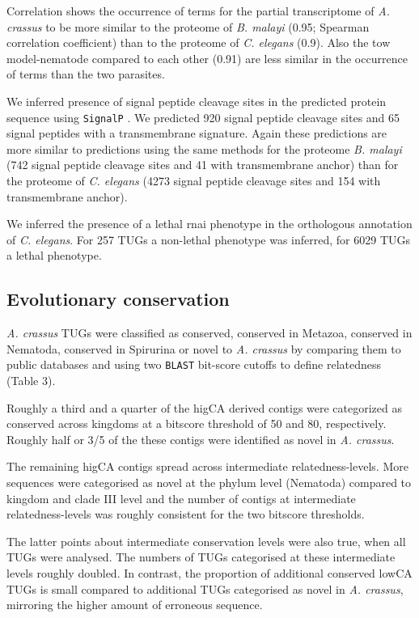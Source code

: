 \documentclass[10pt]{bmc_article}
\newenvironment{bmcformat}{\begin{raggedright}\baselineskip20pt\sloppy\setboolean{publ}{false}}{\end{raggedright}\baselineskip20pt\sloppy}
\begin{document}
\begin{bmcformat}
Correlation shows the occurrence of terms for the partial
transcriptome of \textit{A. crassus} to be more similar to the
proteome of \textit{B. malayi} (0.95;
Spearman correlation coefficient) than to the proteome of
\textit{C. elegans} (0.9). Also the tow
model-nematode compared to each other (0.91)
are less similar in the occurrence of terms than the two parasites.

We inferred presence of signal peptide cleavage sites in the predicted
protein sequence using \texttt{SignalP} \cite{pmid21959131}. We predicted
920 signal peptide cleavage sites and 65 signal
peptides with a transmembrane signature. Again these predictions are
more similar to predictions using the same methods for the proteome
\textit{B. malayi} (742 signal peptide cleavage sites and
41 with transmembrane anchor) than for the proteome of
\textit{C. elegans} (4273 signal peptide cleavage sites
and 154 with transmembrane anchor).

We inferred the presence of a lethal rnai phenotype in the orthologous
annotation of \textit{C. elegans}. For 257
TUGs a non-lethal phenotype was inferred, for
6029 TUGs a lethal phenotype.

\subsection*{Evolutionary conservation}

\textit{A. crassus} TUGs were classified as conserved, conserved in
Metazoa, conserved in Nematoda, conserved in Spirurina or novel to
\textit{A. crassus} by comparing them to public databases and using
two \texttt{BLAST} bit-score cutoffs to define relatedness (Table 3).

Roughly a third and a quarter of the higCA derived contigs were
categorized as conserved across kingdoms at a bitscore threshold of 50
and 80, respectively. Roughly half or 3/5 of the these contigs were
identified as novel in \textit{A. crassus}.

The remaining higCA contigs spread across intermediate
relatedness-levels. More sequences were categorised as novel at the
phylum level (Nematoda) compared to kingdom and clade III level and the
number of contigs at intermediate relatedness-levels was roughly
consistent for the two bitscore thresholds.

The latter points about intermediate conservation levels were also
true, when all TUGs were analysed. The numbers of TUGs categorised at
these intermediate levels roughly doubled. In contrast, the proportion
of additional conserved lowCA TUGs is small compared to additional
TUGs categorised as novel in \textit{A. crassus}, mirroring the higher
amount of erroneous sequence.


\end{bmcformat}
\end{document}
